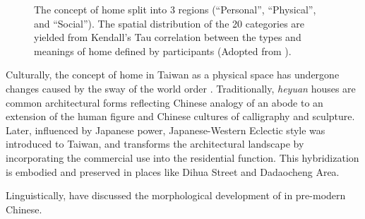 \begin{figure}[H]
\begin{minipage}{\textwidth}
  \centering
  \hspace*{.2in}
  \caption{The concept of home split into 3 regions (``Personal'', ``Physical'', and ``Social''). The spatial distribution of the 20 categories are yielded from Kendall's Tau correlation between the types and meanings of home defined by participants  (Adopted from \textcite{sixsmith1986meaning}).}
  \label{fig:home_regions}
\end{minipage}
\end{figure}

Culturally, the concept of home in Taiwan as a physical space has undergone changes caused by the sway of the world order \parencite{沈孟穎2015台灣現代住宅設計之轉化}. Traditionally, \textit{heyuan} houses are common architectural forms reflecting Chinese analogy of an abode to an extension of the human figure and Chinese cultures of calligraphy and sculpture. Later, influenced by Japanese power, Japanese-Western Eclectic style was introduced to Taiwan, and  transforms the architectural landscape by incorporating the commercial use into the residential function. This hybridization is embodied and preserved in places like Dihua Street and Dadaocheng Area.

Linguistically, \textcite{wang2005jia} have discussed the morphological development of \jia in pre-modern Chinese.

